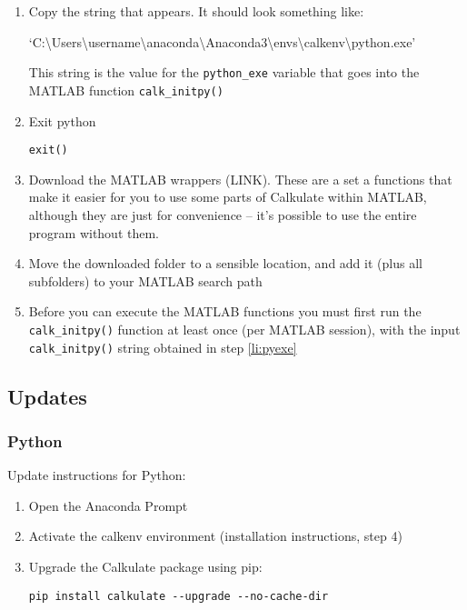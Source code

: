 \documentclass[10pt,a4paper,twoside]{article}
\begin{document}
\begin{enumerate}
  \item\label{li:pyexe} Copy the string that appears. It should look something like:
  
  ‘C:\textbackslash Users\textbackslash username\textbackslash anaconda\textbackslash Anaconda3\textbackslash envs\textbackslash calkenv\textbackslash python.exe’
  
  This string is the value for the \texttt{python\_exe} variable that goes into the MATLAB function \texttt{calk\_initpy()}
  
  \item Exit python
\begin{verbatim}exit()\end{verbatim}
 
  \item Download the MATLAB wrappers (LINK). These are a set a functions that make it easier for you to use some parts of Calkulate within MATLAB, although they are just for convenience -- it's possible to use the entire program without them.
  
  \item Move the downloaded folder to a sensible location, and add it (plus all subfolders) to your MATLAB search path
  
  \item Before you can execute the MATLAB functions you must first run the \texttt{calk\_initpy()} function at least once (per MATLAB session), with the input \texttt{calk\_initpy()} string obtained in step \ref{li:pyexe}

\end{enumerate}

\subsection{Updates}

\subsubsection{Python}

Update instructions for Python:

\begin{enumerate}

  \item Open the Anaconda Prompt
  
  \item Activate the calkenv environment (installation instructions, step 4)

  \item Upgrade the Calkulate package using pip:

\begin{verbatim}
pip install calkulate --upgrade --no-cache-dir
\end{verbatim}

\end{enumerate}
\end{document}

